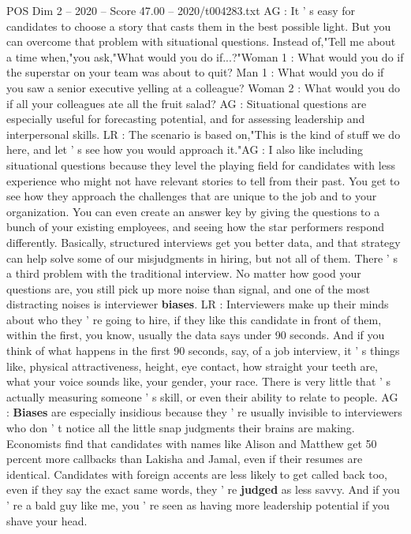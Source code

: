 \begin{textsample}{POS Dim 2 – 2020 – Score 47.00 – 2020/t004283.txt}
AG : It ' s easy for candidates to choose a story that casts them in the best possible light.
But you can overcome that problem with situational questions.
Instead of,"Tell me about a time when,"you ask,"What would you do if...?"Woman 1 : What would you do if the superstar on your team was about to quit?
Man 1 : What would you do if you saw a senior executive yelling at a colleague?
Woman 2 : What would you do if all your colleagues ate all the fruit salad?
AG : Situational questions are especially useful for forecasting potential, and for assessing leadership and interpersonal skills.
LR : The scenario is based on,"This is the kind of stuff we do here, and let ' s see how you would approach it."AG : I also like including situational questions because they level the playing field for candidates with less experience who might not have relevant stories to tell from their past.
You get to see how they approach the challenges that are unique to the job and to your organization.
You can even create an answer key by giving the questions to a bunch of your existing employees, and seeing how the star performers respond differently.
Basically, structured interviews get you better data, and that strategy can help solve some of our misjudgments in hiring, but not all of them.
There ' s a third problem with the traditional interview.
No matter how good your questions are, you still pick up more noise than signal, and one of the most distracting noises is interviewer \textbf{biases}.
LR : Interviewers make up their minds about who they ' re going to hire, if they like this candidate in front of them, within the first, you know, usually the data says under 90 seconds.
And if you think of what happens in the first 90 seconds, say, of a job interview, it ' s things like, physical attractiveness, height, eye contact, how straight your teeth are, what your voice sounds like, your gender, your race.
There is very little that ' s actually measuring someone ' s skill, or even their ability to relate to people.
AG : \textbf{Biases} are especially insidious because they ' re usually invisible to interviewers who don ' t notice all the little snap judgments their brains are making.
Economists find that candidates with names like Alison and Matthew get 50 percent more callbacks than Lakisha and Jamal, even if their resumes are identical.
Candidates with foreign accents are less likely to get called back too, even if they say the exact same words, they ' re \textbf{judged} as less savvy.
And if you ' re a bald guy like me, you ' re seen as having more leadership potential if you shave your head.

\end{textsample}
